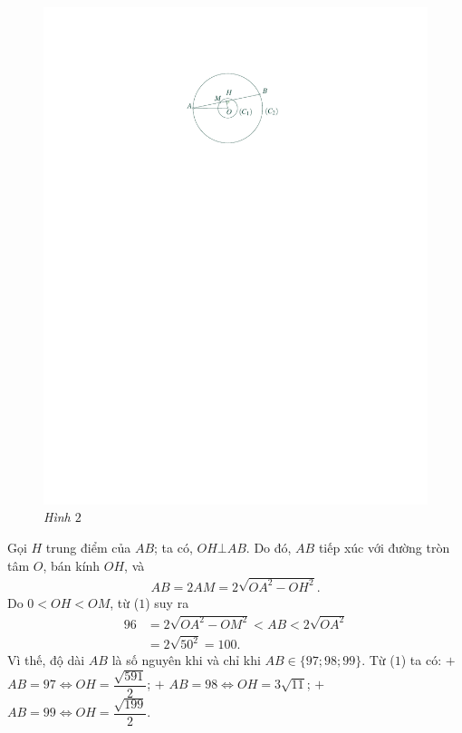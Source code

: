 \begin{multicols}{2}
\begin{figure}[H]
		\includegraphics[width= 1\linewidth]{P663H2}
		\caption{\small\textit{\color{thachthuctoanhoc}Hình $2$}}
		\vspace*{-10pt}
	\end{figure}
	Gọi $H$ trung điểm của $AB$; ta có, $OH \bot AB$. Do đó, $AB$ tiếp xúc với đường tròn tâm $O$, bán kính $OH$, và
	\begin{align*}
		AB = 2AM = 2\sqrt {O{A^2} - O{H^2}}. \tag{$1$}
	\end{align*}
	Do $0 < OH < OM$, từ ($1$) suy ra
	\begin{align*}
		96 &= 2\sqrt {O{A^2} - O{M^2}}  < AB < 2\sqrt {O{A^2}}  \\
		&= 2\sqrt {{{50}^2}}  = 100. \tag{$1$}
	\end{align*}
	Vì thế, độ dài $AB$ là số nguyên khi và chỉ khi $AB \in \{97; 98; 99\}$.
	\vskip 0.05cm
	Từ ($1$) ta có:
	\vskip 0.05cm
	$+$ $AB = 97  \Leftrightarrow  OH = \dfrac{{\sqrt {591} }}{2}$;
	\vskip 0.05cm
	$+$ $AB = 98  \Leftrightarrow OH = 3\sqrt{11}$;
	\vskip 0.05cm
	$+$ $AB = 99  \Leftrightarrow  OH = \dfrac{{\sqrt {199} }}{2}$.

\end{multicols}
